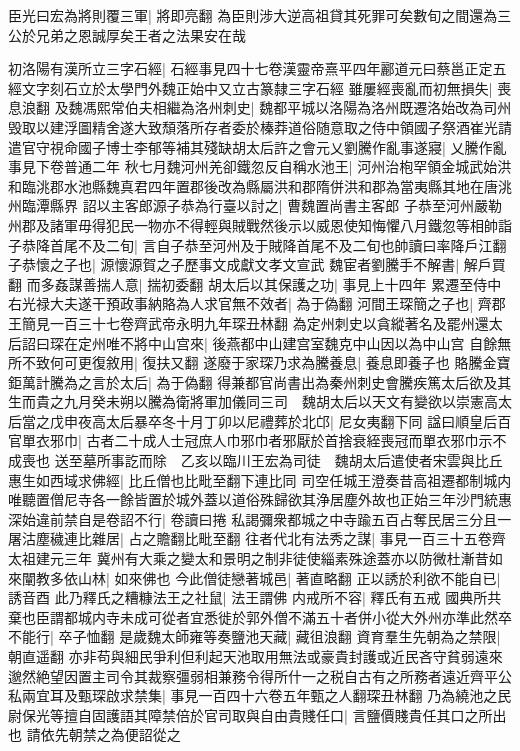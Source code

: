 臣光曰宏為將則覆三軍|{
	將即亮翻}
為臣則涉大逆高祖貸其死罪可矣數旬之間還為三公於兄弟之恩誠厚矣王者之法果安在哉

初洛陽有漢所立三字石經|{
	石經事見四十七卷漢靈帝熹平四年酈道元曰蔡邕正定五經文字刻石立於太學門外魏正始中又立古篆隸三字石經}
雖屢經喪亂而初無損失|{
	喪息浪翻}
及魏馮熙常伯夫相繼為洛州刺史|{
	魏都平城以洛陽為洛州既遷洛始改為司州}
毁取以建浮圖精舍遂大致頹落所存者委於榛莽道俗随意取之侍中領國子祭酒崔光請遣官守視命國子博士李郁等補其殘缺胡太后許之會元乂劉騰作亂事遂寢|{
	乂騰作亂事見下卷普通二年}
秋七月魏河州羌卻鐵忽反自稱水池王|{
	河州治枹罕領金城武始洪和臨洮郡水池縣魏真君四年置郡後改為縣屬洪和郡隋併洪和郡為當夷縣其地在唐洮州臨潭縣界}
詔以主客郎源子恭為行臺以討之|{
	曹魏置尚書主客郎}
子恭至河州嚴勒州郡及諸軍毋得犯民一物亦不得輕與賊戰然後示以威恩使知悔懼八月鐵忽等相帥詣子恭降首尾不及二旬|{
	言自子恭至河州及于賊降首尾不及二旬也帥讀曰率降戶江翻}
子恭懷之子也|{
	源懷源賀之子歷事文成獻文孝文宣武}
魏宦者劉騰手不解書|{
	解戶買翻}
而多姦謀善揣人意|{
	揣初委翻}
胡太后以其保護之功|{
	事見上十四年}
累遷至侍中右光禄大夫遂干預政事納賂為人求官無不效者|{
	為于偽翻}
河間王琛簡之子也|{
	齊郡王簡見一百三十七卷齊武帝永明九年琛丑林翻}
為定州刺史以貪縱著名及罷州還太后詔曰琛在定州唯不將中山宫來|{
	後燕都中山建宫室魏克中山因以為中山宫}
自餘無所不致何可更復敘用|{
	復扶又翻}
遂廢于家琛乃求為騰養息|{
	養息即養子也}
賂騰金寶鉅萬計騰為之言於太后|{
	為于偽翻}
得兼都官尚書出為秦州刺史會騰疾篤太后欲及其生而貴之九月癸未朔以騰為衛將軍加儀同三司　魏胡太后以天文有變欲以崇憲高太后當之戊申夜高太后暴卒冬十月丁卯以尼禮葬於北邙|{
	尼女夷翻下同}
諡曰順皇后百官單衣邪巾|{
	古者二十成人士冠庶人巾邪巾者邪厭於首捨衰絰喪冠而單衣邪巾示不成喪也}
送至墓所事訖而除　乙亥以臨川王宏為司徒　魏胡太后遣使者宋雲與比丘惠生如西域求佛經|{
	比丘僧也比毗至翻下連比同}
司空任城王澄奏昔高祖遷都制城内唯聽置僧尼寺各一餘皆置於城外蓋以道俗殊歸欲其浄居塵外故也正始三年沙門統惠深始違前禁自是卷詔不行|{
	卷讀曰捲}
私謁彌衆都城之中寺踰五百占奪民居三分且一屠沽塵穢連比雜居|{
	占之贍翻比毗至翻}
往者代北有法秀之謀|{
	事見一百三十五卷齊太祖建元三年}
冀州有大乘之變太和景明之制非徒使緇素殊途蓋亦以防微杜漸昔如來闡教多依山林|{
	如來佛也}
今此僧徒戀著城邑|{
	著直略翻}
正以誘於利欲不能自已|{
	誘音酉}
此乃釋氏之糟糠法王之社鼠|{
	法王謂佛}
内戒所不容|{
	釋氏有五戒}
國典所共棄也臣謂都城内寺未成可從者宜悉徙於郭外僧不滿五十者併小從大外州亦準此然卒不能行|{
	卒子恤翻}
是歲魏太師雍等奏鹽池天藏|{
	藏徂浪翻}
資育羣生先朝為之禁限|{
	朝直遥翻}
亦非苟與細民爭利但利起天池取用無法或豪貴封護或近民吝守貧弱遠來邈然絶望因置主司令其裁察彊弱相兼務令得所什一之税自古有之所務者遠近齊平公私兩宜耳及甄琛啟求禁集|{
	事見一百四十六卷五年甄之人翻琛丑林翻}
乃為繞池之民尉保光等擅自固護語其障禁倍於官司取與自由貴賤任口|{
	言鹽價賤貴任其口之所出也}
請依先朝禁之為便詔從之

